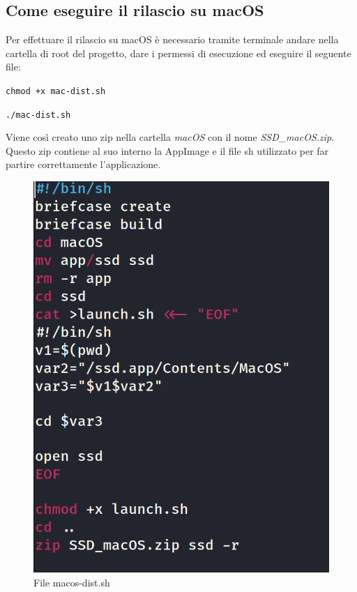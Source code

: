 \subsection{Come eseguire il rilascio su macOS}
Per effettuare il rilascio su macOS è necessario tramite terminale andare nella cartella di root del progetto, dare i permessi di esecuzione ed eseguire il seguente file:
\newline{}\centerline{\texttt{chmod +x mac-dist.sh}}
\newline{}\centerline{\texttt{./mac-dist.sh}}\newline{}
Viene così creato uno zip nella cartella \textit{macOS} con il nome \textit{SSD\_macOS.zip}. \\
Questo zip contiene al suo interno la AppImage e il file sh utilizzato per far partire correttamente l'applicazione.
\begin{figure}[H]
    \centering
    \includegraphics[scale = 0.5]{components/img/macos-deploy-script.png}
    \caption{File macos-dist.sh}
    \label{fig:File win-dist.bat}
\end{figure}


